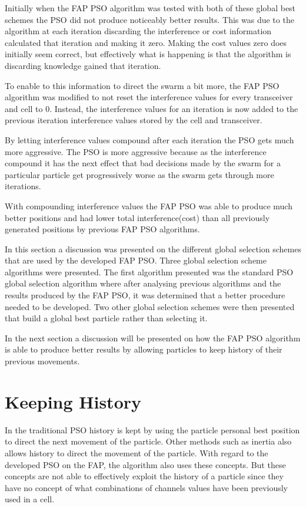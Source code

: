 Initially when the FAP PSO algorithm was tested with both of these global best schemes the PSO did not produce noticeably better results. This was due to the algorithm at each iteration discarding the interference or cost information calculated that iteration and making it zero. Making the cost values zero does initially seem correct, but effectively what is happening is that the algorithm is discarding knowledge gained that iteration.

To enable to this information to direct the swarm a bit more, the FAP PSO algorithm was modified to not reset the interference values for every transceiver and cell to 0. Instead, the interference values for an iteration is now added to the previous iteration interference values stored by the cell and transceiver. 

By letting interference values compound after each iteration the PSO gets much more aggressive. The PSO is more aggressive because as the interference compound it has the next effect that bad decisions made by the swarm for a particular particle get progressively worse as the swarm gets through more iterations.

With compounding interference values the FAP PSO was able to produce much better positions and had lower total interference(cost) than all previously generated positions by previous FAP PSO algorithms. 

In this section a discussion was presented on the different global selection schemes that are used by the developed FAP PSO. Three global selection scheme algorithms were presented. The first algorithm presented was the standard PSO global selection algorithm where after analysing previous algorithms and the results produced by the FAP PSO, it was determined that a better procedure needed to be developed. Two other global selection schemes were then presented that build a global best particle rather than selecting it.

In the next section a discussion will be presented on how the FAP PSO algorithm is able to produce better results by allowing particles to keep history of their previous movements.
\section{Keeping History}
\label{sec:keepinghistory}
In the traditional PSO history is kept by using the particle personal best position to direct the next movement of the particle. Other methods such as inertia also allows history to direct the movement of the particle. With regard to the developed PSO on the FAP, the algorithm also uses these concepts. But these concepts are not able to effectively exploit the history of a particle since they have no concept of what combinations of channels values have been previously used in a cell.


